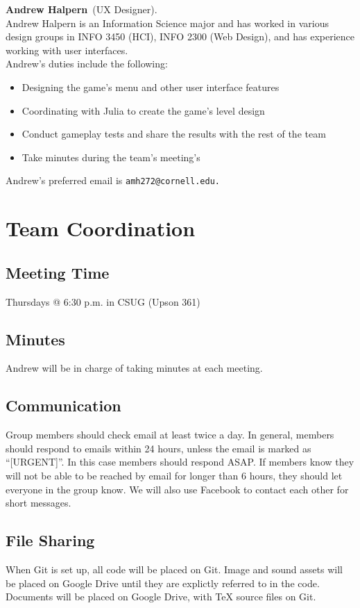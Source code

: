 \documentclass[letterpaper,11pt]{texMemo}
\newcommand{\teammember}[2]{ \textbf{#1}\ (#2).\ }
\newenvironment{duties}[1]
               {
                 #1's duties include the following:
                 \begin{itemize}
               }
               {
                 \end{itemize}
               }
\newcommand{\preferredemail}[2]{#1's preferred email is \texttt{#2}\\}
\begin{document}
\teammember{Andrew Halpern}{UX Designer}\\
Andrew Halpern is an Information Science major and has worked in various 
design groups in INFO 3450 (HCI), INFO 2300 (Web Design), and has experience 
working with user interfaces.\\
\begin{duties}{Andrew}
\item{Designing the game’s menu and other user interface features}
\item{Coordinating with Julia to create the game’s level design}
\item{Conduct gameplay tests and share the results with the rest of the team}
\item{Take minutes during the team’s meeting’s}
\end{duties}
\preferredemail{Andrew}{amh272@cornell.edu. }

\section*{Team Coordination}
\subsection*{Meeting Time}
Thursdays @ 6:30 p.m. in CSUG (Upson 361)

\subsection*{Minutes}
Andrew will be in charge of taking minutes at each meeting.

\subsection*{Communication}
Group members should check email at least twice a day. In general, members 
should respond to emails within 24 hours, unless the email is marked as 
``[URGENT]''. In this case members should respond ASAP. 
If members know they
will not be able to be reached by email for longer than 
6 hours, they should let everyone in the group know. We will also use Facebook 
to contact each other for short messages.

\subsection*{File Sharing}
When Git is set up, all code will be placed on Git. Image and sound assets will 
be placed on Google Drive until they are explictly referred to in the code. 
Documents will be placed on Google Drive, with TeX source files on Git.
\end{document}
